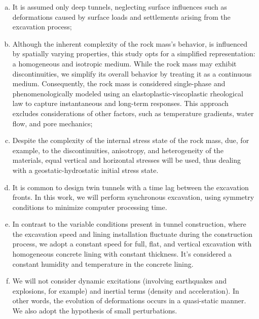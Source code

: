 \documentclass[a4paper,fleqn]{cas-sc}
\begin{document}
\begin{enumerate}[(a)]

\item It is assumed only deep tunnels, neglecting surface influences such as deformations caused by surface loads and settlements arising from the excavation process;

\item Although the inherent complexity of the rock mass's behavior, is influenced by spatially varying properties, this study opts for a simplified representation: a homogeneous and isotropic medium. While the rock mass may exhibit discontinuities, we simplify its overall behavior by treating it as a continuous medium. Consequently, the rock mass is considered single-phase and phenomenologically modeled using an elastoplastic-viscoplastic rheological law to capture instantaneous and long-term responses. This approach excludes considerations of other factors, such as temperature gradients, water flow, and pore mechanics;

\item Despite the complexity of the internal stress state of the rock mass, due, for example, to the discontinuities, anisotropy, and heterogeneity of the materials, equal vertical and horizontal stresses will be used, thus dealing with a geostatic-hydrostatic initial stress state.

\item It is common to design twin tunnels with a time lag between the excavation fronts. In this work, we will perform synchronous excavation, using symmetry conditions to minimize computer processing time.

\item In contrast to the variable conditions present in tunnel construction, where the excavation speed and lining installation fluctuate during the construction process, we adopt a constant speed for full, flat, and vertical excavation with homogeneous concrete lining with constant thickness. It's considered a constant humidity and temperature in the concrete lining.

\item We will not consider dynamic excitations (involving earthquakes and explosions, for example) and inertial terms (density and acceleration). In other words, the evolution of deformations occurs in a quasi-static manner. We also adopt the hypothesis of small perturbations.

\end{enumerate}
\end{document}
